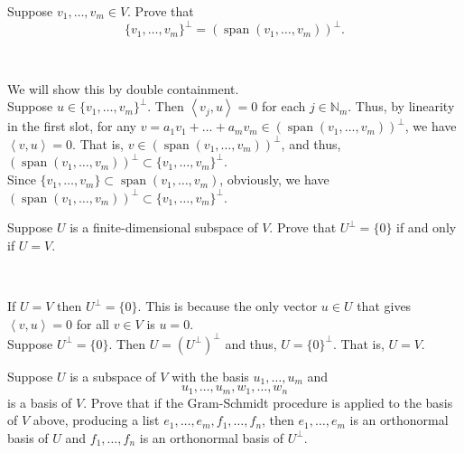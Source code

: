 \documentclass[12 pt, letterpaper]{hmcpset}
\begin{document}
\begin{problem}[1]
	Suppose $v_{1}, \dots, v_{m} \in V$. Prove that
	\[
		\{ v_{1}, \dots, v_{m} \}^{\perp} = (\operatorname{span}(v_{1}, \dots, v_{m}))^\perp.
	\]
\end{problem}

\begin{solution}~
	
	We will show this by double containment. \\

	Suppose  $u \in \{ v_{1}, \dots, v_{m} \}^{\perp}$. Then $\left < v_{j}, u \right > = 0$ for each $j \in \mathbb{N}_{m}$. Thus, by linearity in the first slot, for any $v = a_{1} v_{1} + \dots + a_m v_{m} \in (\operatorname{span}(v_{1}, \dots, v_{m}))^{\perp}$, we have $\left < v, u \right > = 0$. That is, $v \in (\operatorname{span}(v_{1}, \dots, v_{m}))^{\perp}$, and thus, $(\operatorname{span}(v_{1}, \dots, v_{m}))^{\perp} \subset \{ v_{1}, \dots, v_{m} \}^{\perp}$. \\

	Since $\{ v_{1}, \dots, v_{m} \} \subset \operatorname{span}(v_{1}, \dots, v_{m})$, obviously, we have $(\operatorname{span}(v_{1}, \dots, v_{m}))^{\perp} \subset \{ v_{1}, \dots, v_{m} \}^{\perp}$.
\end{solution}

\pagebreak

\begin{problem}[2]
	Suppose $U$ is a finite-dimensional subspace of $V$. Prove that $U^{\perp} = \{ 0 \}$ if and only if $U = V$.
\end{problem}

\begin{solution}~
	
	If $U = V$ then $U^{\perp} = \{ 0 \}$. This is because the only vector $u \in U$ that gives $\left < v, u \right > = 0$ for all $v \in V$ is $u = 0$. \\ 

	Suppose $U^{\perp} = \{ 0 \}$. Then $U = (U^{\perp})^{\perp}$ and thus, $U = \{ 0 \}^{\perp}$. That is, $U = V$.
\end{solution}

\pagebreak

\begin{problem}[3]
	Suppose $U$ is a subspace of $V$ with the basis $u_{1}, \dots, u_{m}$ and
	\[
		u_{1}, \dots, u_{m}, w_{1}, \dots, w_{n}
	\]
	is a basis of $V$. Prove that if the Gram-Schmidt procedure is applied to the basis of $V$ above, producing a list $e_{1}, \dots, e_{m}, f_{1}, \dots, f_{n}$, then $e_{1}, \dots, e_{m}$ is an orthonormal basis of $U$ and $f_{1}, \dots, f_{n}$ is an orthonormal basis of $U^{\perp}$.
\end{problem}
\end{document}
